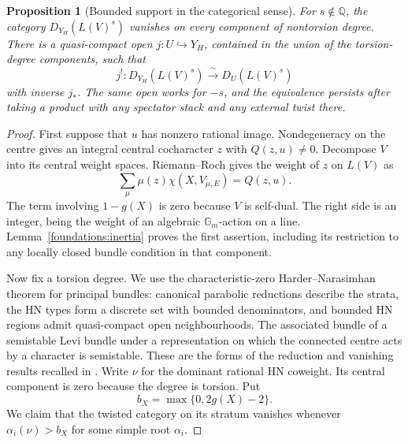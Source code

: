 \documentclass[11pt]{article}
\numberwithin{equation}{section}
\newtheorem{proposition}[theorem]{Proposition}
\theoremstyle{definition}
\theoremstyle{remark}
\begin{document}
\begin{proposition}[Bounded support in the categorical sense]\label{foundations:cutoff}
For $s\notin\mathbb Q$, the category $D_{Y_H}(L(V)^s)$ vanishes on every
component of nontorsion degree.  There is a quasi-compact open
$j:U\hookrightarrow Y_H$, contained in the union of the torsion-degree
components, such that
\begin{equation}\label{foundations:cutoff-equivalence}
 j^!:D_{Y_H}(L(V)^s)\xrightarrow{\ \sim\ }D_U(L(V)^s)
\end{equation}
with inverse $j_*$.  The same open works for $-s$, and the equivalence
persists after taking a product with any spectator stack and any external
twist there.
\end{proposition}

\begin{proof}
First suppose that $u$ has nonzero rational image.  Nondegeneracy on the
centre gives an integral central cocharacter $z$ with $Q(z,u)\ne0$.
Decompose $V$ into its central weight spaces.  Riemann--Roch gives the
weight of $z$ on $L(V)$ as
\begin{equation}\label{foundations:rr-weight}
 \sum_{\mu}\mu(z)\chi(X,V_{\mu,E})=Q(z,u).
\end{equation}
The term involving $1-g(X)$ is zero because $V$ is self-dual.
The right side is an integer, being the weight of an algebraic
$\mathbb G_m$-action on a line.  Lemma~\ref{foundations:inertia} proves the
first assertion, including its restriction to any locally closed bundle
condition in that component.

Now fix a torsion degree.  We use the characteristic-zero
Harder--Narasimhan theorem for principal bundles: canonical parabolic
reductions describe the strata, the HN types form a discrete set with
bounded denominators, and bounded HN regions admit quasi-compact open
neighbourhoods.  The associated bundle of a semistable Levi bundle under
a representation on which the connected centre acts by a character is
semistable.  These are the forms of the reduction and vanishing results
recalled in \cite[Sections~7.3--7.4 and~10.1]{DrinfeldGaitsgoryBun}.
Write $\nu$ for the dominant rational HN coweight.  Its central component
is zero because the degree is torsion.  Put
\[
 b_X=\max\{0,2g(X)-2\}.
\]
We claim that the twisted category on its stratum vanishes whenever
$\alpha_i(\nu)>b_X$ for some simple root $\alpha_i$.


\end{proof}
\end{document}
